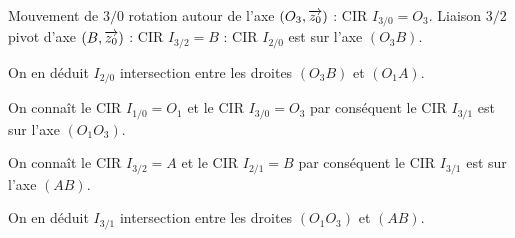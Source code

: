 \documentclass[11pt,oneside]{article}
\begin{document}
\begin{exemple}
Mouvement de $3/0$ rotation autour de l'axe $(O_3,\overrightarrow{z_0})$ : CIR $I_{3/0}=O_3$. 
Liaison $3/2$ pivot d'axe $(B,\overrightarrow{z_0})$ : CIR $I_{3/2}=B$ : CIR $I_{2/0}$ est sur l'axe $(O_3 B)$.

On en déduit $I_{2/0}$ intersection entre les droites $(O_3 B)$ et $(O_1 A)$.


On connaît le CIR $I_{1/0}=O_1$ et le CIR $I_{3/0}=O_3$ par conséquent le CIR $I_{3/1}$ est sur l'axe $(O_1O_3)$. 

On connaît le CIR $I_{3/2}=A$ et le CIR $I_{2/1}=B$ par conséquent le CIR $I_{3/1}$ est sur l'axe $(AB)$.

On en déduit $I_{3/1}$ intersection entre les droites $(O_1O_3)$ et $(AB)$.

\end{exemple}
\end{document}
